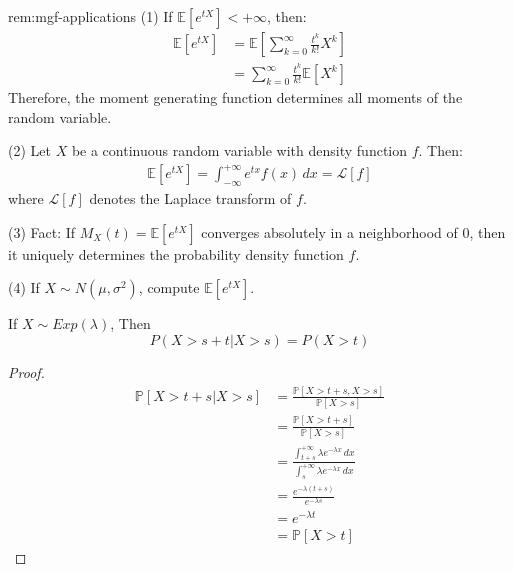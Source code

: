             \begin{remark}{rem:mgf-applications}
                (1) If $\mathbb{E}[e^{tX}] < +\infty$, then:
                \begin{align*}
                \mathbb{E}[e^{tX}] &= \mathbb{E}\left[\sum_{k=0}^{\infty} \frac{t^k}{k!}X^k\right] \\
                &= \sum_{k=0}^{\infty} \frac{t^k}{k!}\mathbb{E}[X^k]
                \end{align*}
                Therefore, the moment generating function determines all moments of the random variable.
                
                (2) Let $X$ be a continuous random variable with density function $f$. Then:
                \begin{align*}
                \mathbb{E}[e^{tX}] = \int_{-\infty}^{+\infty} e^{tx}f(x)\,dx = \mathcal{L}[f]
                \end{align*}
                where $\mathcal{L}[f]$ denotes the Laplace transform of $f$.
                
                (3) Fact: If $M_X(t) = \mathbb{E}[e^{tX}]$ converges absolutely in a neighborhood of 0, then it uniquely determines the probability density function $f$.
                
                (4) If $X \sim N(\mu,\sigma^2)$, compute $\mathbb{E}[e^{tX}]$.
                \end{remark}
\begin{proposition}{}
If $ X\sim Exp(\lambda) $, Then $$
    P(X>s+t|X>s)=P(X>t)
$$  
\end{proposition}   
\begin{proof}
    \begin{align*}
    \mathbb{P}[X > t + s | X > s] &= \frac{\mathbb{P}[X > t + s, X > s]}{\mathbb{P}[X > s]} \\
    &= \frac{\mathbb{P}[X > t + s]}{\mathbb{P}[X > s]} \\
    &= \frac{\int_{t+s}^{+\infty} \lambda e^{-\lambda x} \, dx}{\int_{s}^{+\infty} \lambda e^{-\lambda x} \, dx} \\
    &= \frac{e^{-\lambda(t+s)}}{e^{-\lambda s}} \\
    &= e^{-\lambda t} \\
    &= \mathbb{P}[X > t]
    \end{align*}
    \end{proof}
    
